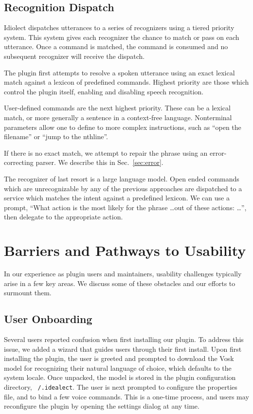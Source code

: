 \documentclass[conference]{IEEEtran}
\begin{document}
\subsection{Recognition Dispatch}

Idiolect dispatches utterances to a series of recognizers using a tiered priority system. This system gives each recognizer the chance to match or pass on each utterance. Once a command is matched, the command is consumed and no subsequent recognizer will receive the dispatch.

The plugin first attempts to resolve a spoken utterance using an exact lexical match against a lexicon of predefined commands. Highest priority are those which control the plugin itself, enabling and disabling speech recognition.

User-defined commands are the next highest priority. These can be a lexical match, or more generally a sentence in a context-free language. Nonterminal parameters allow one to define to more complex instructions, such as ``open the \textlangle filename'' or ``jump to the \textlangle nth\textrangle line''.

If there is no exact match, we attempt to repair the phrase using an error-correcting parser. We describe this in Sec.~\ref{sec:error}.

The recognizer of last resort is a large language model. Open ended commands which are unrecognizable by any of the previous approaches are dispatched to a service which matches the intent against a predefined lexicon. We can use a prompt, ``What action is the most likely for the phrase \ldots out of these actions: \ldots'', then delegate to the appropriate action.

\section{Barriers and Pathways to Usability}\label{sec:usability}

In our experience as plugin users and maintainers, usability challenges typically arise in a few key areas. We discuss some of these obstacles and our efforts to surmount them.

\subsection{User Onboarding}

Several users reported confusion when first installing our plugin. To address this issue, we added a wizard that guides users through their first install. Upon first installing the plugin, the user is greeted and prompted to download the Vosk model for recognizing their natural language of choice, which defaults to the system locale. Once unpacked, the model is stored in the plugin configuration directory, \texttt{~/.idealect}. The user is next prompted to configure the properties file, and to bind a few voice commands. This is a one-time process, and users may reconfigure the plugin by opening the settings dialog at any time.
\end{document}
